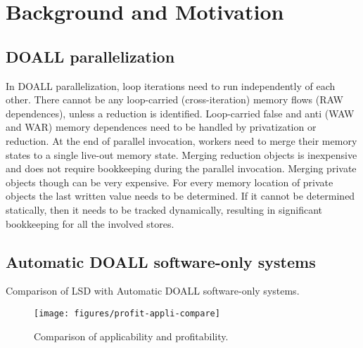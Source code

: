 \section{Background and Motivation}
\label{sec:motivation}

\subsection{DOALL parallelization}

In DOALL parallelization, loop iterations need to run independently of each
other.  There cannot be any loop-carried (cross-iteration) memory flows (RAW
dependences), unless a reduction is identified. Loop-carried false and anti (WAW
and WAR) memory dependences need to be handled by privatization or reduction.
At the end of parallel invocation, workers need to merge their memory states to
a single live-out memory state.  Merging reduction objects is inexpensive and
does not require bookkeeping during the parallel invocation.  Merging private
objects though can be very expensive. For every memory location of private
objects the last written value needs to be determined. If it cannot be
determined statically, then it needs to be tracked dynamically, resulting in
significant bookkeeping for all the involved stores.

\subsection{Automatic DOALL software-only systems}

\begin{table*}
  
  \caption{
    Comparison of LSD with Automatic DOALL software-only systems.
  }
  \label{tab:related-work}
    \vspace{-10pt}
\end{table*}

\begin{figure}
  \texttt{[image: figures/profit-appli-compare]}
  \caption{Comparison of applicability and profitability.}
  \label{fig:profit-appli-compare}
\end{figure}


